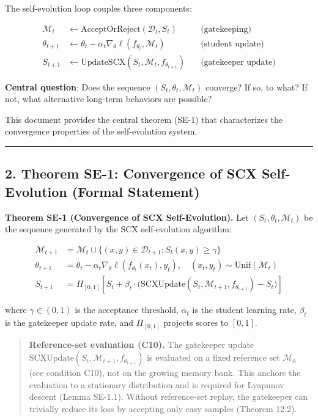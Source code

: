 \documentclass[
  12pt,
]{article}
\begin{document}
The self-evolution loop couples three components:

\[
\begin{aligned}
\mathcal{M}_t &\gets \text{AcceptOrReject}(\mathcal{D}_t, S_t) \quad &\text{(gatekeeping)} \\
\theta_{t+1} &\gets \theta_t - \alpha_t \nabla_\theta \ell(f_{\theta_t}, \mathcal{M}_t) \quad &\text{(student update)} \\
S_{t+1} &\gets \text{UpdateSCX}(S_t, \mathcal{M}_t, f_{\theta_{t+1}}) \quad &\text{(gatekeeper update)}
\end{aligned}
\]

\textbf{Central question}: Does the sequence
\((S_t, \theta_t, \mathcal{M}_t)\) converge? If so, to what? If not,
what alternative long-term behaviors are possible?

This document provides the central theorem (SE-1) that characterizes the
convergence properties of the self-evolution system.

\begin{center}\rule{0.5\linewidth}{0.5pt}\end{center}

\subsection{2. Theorem SE-1: Convergence of SCX Self-Evolution (Formal
Statement)}\label{theorem-se-1-convergence-of-scx-self-evolution-formal-statement}

\textbf{Theorem SE-1 (Convergence of SCX Self-Evolution).} Let
\((S_t, \theta_t, \mathcal{M}_t)\) be the sequence generated by the SCX
self-evolution algorithm:

\[
\begin{aligned}
\mathcal{M}_{t+1} &= \mathcal{M}_t \cup \{(x, y) \in \mathcal{D}_{t+1} : S_t(x,y) \geq \gamma\} \\
\theta_{t+1} &= \theta_t - \alpha_t \nabla_\theta \ell(f_{\theta_t}(x_t), y_t), \quad (x_t, y_t) \sim \text{Unif}(\mathcal{M}_t) \\
S_{t+1} &= \Pi_{[0,1]} \left[ S_t + \beta_t \cdot \bigl( \text{SCXUpdate}(S_t, \mathcal{M}_{t+1}, f_{\theta_{t+1}}) - S_t \bigr) \right]
\end{aligned}
\]

where \(\gamma \in (0,1)\) is the acceptance threshold, \(\alpha_t\) is
the student learning rate, \(\beta_t\) is the gatekeeper update rate,
and \(\Pi_{[0,1]}\) projects scores to \([0,1]\).

\begin{quote}
\textbf{Reference-set evaluation (C10).} The gatekeeper update
\(\text{SCXUpdate}(S_t, \mathcal{M}_{t+1}, f_{\theta_{t+1}})\) is
evaluated on a fixed reference set \(\mathcal{M}_0\) (see condition
C10), not on the growing memory bank. This anchors the evaluation to a
stationary distribution and is required for Lyapunov descent (Lemma
SE-1.1). Without reference-set replay, the gatekeeper can trivially
reduce its loss by accepting only easy samples (Theorem 12.2).
\end{quote}
\end{document}
